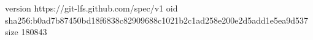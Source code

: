 version https://git-lfs.github.com/spec/v1
oid sha256:b0ad7b87450bd18f6838c82909688c1021b2c1ad258e200e2d5add1e5ea9d537
size 180843
